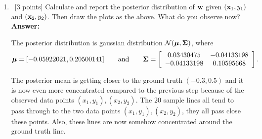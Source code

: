 \documentclass[12pt, fullpage,letterpaper]{article}
\def\red{\color{red}}
\def\blackblue{\color{black!40!blue}}
\begin{document}
\begin{enumerate}
\begin{enumerate}
{		
	}
		\item~[3 points] Calculate and report the posterior distribution of ${\bf w}$ given $({\bf x}_1, y_1)$ and $({\bf x}_2, y_2)$. Then draw the plots as the above. What do you observe now?  \\
	{\bf \red Answer:} {\blackblue 
	The posterior distribution is gaussian distribution $\mathcal{N}(\boldsymbol{\mu}, \boldsymbol{\Sigma})$, where 
	$$\boldsymbol{\mu} =  [-0.05922021, 0.20500141]\quad\quad\text{and}\quad \quad \boldsymbol{\Sigma} = \left[\begin{array}{cc}0.03430475 & -0.04133198\\
	-0.04133198 & 0.10595668
	\end{array}\right].$$
		
	The posterior mean is getting closer to the ground truth $(-0.3,0.5)$ and it is now even more concentrated compared to the previous step because of the observed data points $(x_1,y_1), (x_2,y_2)$. 
	The $20$ sample lines all tend to pass through to the two data points $(x_1,y_1), (x_2,y_2)$, they all pass close these points. Also, these lines are now somehow concentrated around the ground truth line. 
	
}
\end{enumerate}
\end{enumerate}
\end{document}
